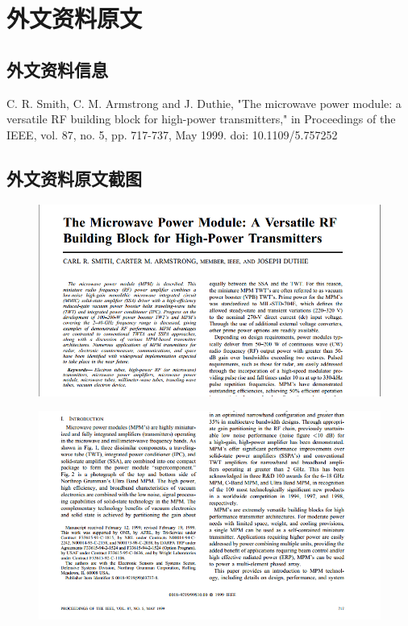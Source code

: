 
\chapter{外文资料原文}


\section{外文资料信息}

C. R. Smith, C. M. Armstrong and J. Duthie, "The microwave power module: a versatile RF building block for high-power transmitters," in Proceedings of the IEEE, vol. 87, no. 5, pp. 717-737, May 1999.
doi: 10.1109/5.757252

\section{外文资料原文截图}

\begin{figure}[tbph]
\centering
\includegraphics[width=0.7\linewidth]{../pics/Capture1}
\end{figure}

\begin{figure}[tbph]
\centering
\includegraphics[width=0.7\linewidth]{../pics/Capture2}
\end{figure}


